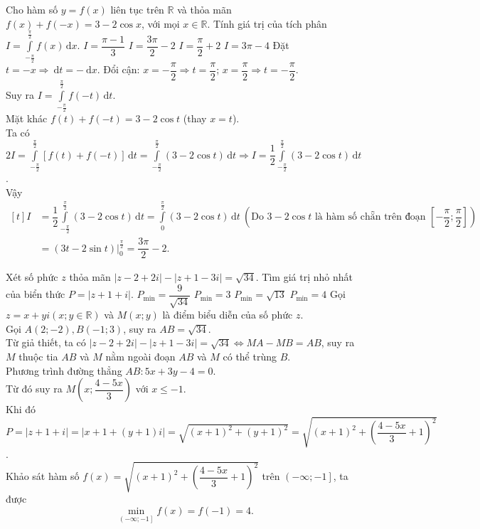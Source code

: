 \begin{ex}%
 Cho hàm số $y=f(x)$ liên tục trên $\mathbb{R}$ và thỏa mãn $f(x)+f\left(-x\right)=3-2\cos x$, với mọi $x\in \mathbb{R}$. Tính giá trị của tích phân $I=\displaystyle\int\limits_{-\tfrac{\pi}{2}}^{\tfrac{\pi}{2}}{f(x) \mathrm{\, d}x}$.
 \choice
  {$I=\dfrac{\pi-1}{3}$}
  {\True $I=\dfrac{3\pi}{2}-2$}
  {$I=\dfrac{\pi}{2}+2$}
  {$I=3\pi-4$}
 \loigiai
  {
  Đặt $t=-x\Rightarrow \mathrm{\ d}t=- \mathrm{\ d}x$.
  Đổi cận: $x=-\dfrac{\pi}{2}\Rightarrow t=\dfrac{\pi}{2}$; $x=\dfrac{\pi}{2}\Rightarrow t=-\dfrac{\pi}{2}$.\\
  Suy ra $I=\displaystyle\int\limits_{-\tfrac{\pi}{2}}^{\tfrac{\pi}{2}}{f\left(-t\right) \mathrm{\,d}t}$.\\
  Mặt khác $f(t)+f\left(-t\right)=3-2\cos t$ (thay $x=t$).\\
  Ta có $2I=\displaystyle\int\limits_{-\tfrac{\pi}{2}}^{\tfrac{\pi}{2}}\left[f(t)+f(-t)\right]\mathrm{\, d}t=\displaystyle\int\limits_{-\tfrac{\pi}{2}}^{\tfrac{\pi}{2}}(3-2\cos t)\mathrm{\, d}t\Rightarrow I=\dfrac{1}{2}\displaystyle\int\limits_{-\tfrac{\pi}{2}}^{\tfrac{\pi}{2}}(3-2\cos t)\mathrm{\,d}t$.\\
  Vậy $ \begin{aligned}[t]
\displaystyle I&=\dfrac{1}{2}\int\limits_{-\tfrac{\pi}{2}}^{\tfrac{\pi}{2}}(3-2\cos t)\mathrm{\, d}t=\displaystyle\int\limits_0^{\tfrac{\pi}{2}}(3-2\cos t)\mathrm{\,d}t\ \left(\text{Do $3-2\cos t$ là hàm số chẵn trên đoạn $\left[-\dfrac{\pi}{2};\dfrac{\pi}{2}\right]$}\right) \\
& = \left(3t-2\sin t\right)\bigg|_0^{\tfrac{\pi}{2}}=\dfrac{3\pi}{2}-2.
\end{aligned}$	
}
\end{ex}


\begin{ex}%
 Xét số phức $z$ thỏa mãn $\left| z-2+2i\right|-\left| z+1-3i\right|=\sqrt{34}.$ Tìm giá trị nhỏ nhất của biển thức $P=\left| z+1+i\right|.$
 \choice
  {$P_{\min}=\dfrac{9}{\sqrt{34}}$}
  {$P_{\min}=3$}
  {$P_{\min}=\sqrt{13}$}
  {\True $P_{\min}=4$}
 \loigiai
  {
  Gọi $z=x+yi\left(x;y\in \mathbb{R}\right)$ và $M\left(x;y\right)$ là điểm biểu diễn của số phức $z.$\\
  Gọi $A\left(2;-2\right),B\left(-1;3\right)$, suy ra $AB=\sqrt{34}.$\\
  Từ giả thiết, ta có $\left| z-2+2i\right|-\left| z+1-3i\right|=\sqrt{34}\Leftrightarrow MA-MB=AB$, suy ra $M$ thuộc tia $AB$ và $M$ nằm ngoài đoạn $AB$ và $M$ có thể trùng $B$.\\
  Phương trình đường thẳng $AB \colon 5x+3y-4=0$.\\
  Từ đó suy ra $M\left(x;\dfrac{4-5x}{3}\right)$ với $x\le-1$.\\
  Khi đó $P=\left| z+1+i\right|=\left| x+1+\left(y+1\right)i\right|=\sqrt{{\left(x+1\right)}^2+{\left(y+1\right)}^2}=\sqrt{{\left(x+1\right)}^2+{\left(\dfrac{4-5x}{3}+1\right)}^2}$.\\
  Khảo sát hàm số $f(x)=\sqrt{{\left(x+1\right)}^2+{\left(\dfrac{4-5x}{3}+1\right)}^2}$ trên $\left(-\infty;-1\right]$, ta được
$$\underset{\left(-\infty;-1\right]}{\mathop{\min}}f(x)=f\left(-1\right)=4.$$
  }
\end{ex}


